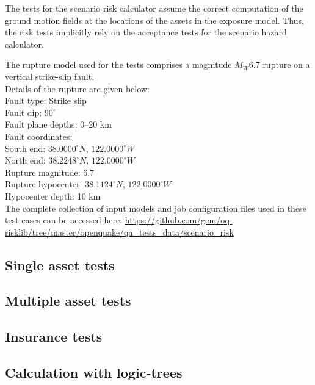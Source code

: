 The tests for the scenario risk calculator assume the correct computation of the ground motion fields at the locations of the assets in the exposure model. Thus, the risk tests implicitly rely on the acceptance tests for the scenario hazard calculator.

The rupture model used for the tests comprises a magnitude $M_W 6.7$ rupture on a vertical strike-slip fault.\\

\noindent Details of the rupture are given below:\\

\noindent
Fault type: Strike slip\\
Fault dip: $90^{\circ}$\\
Fault plane depths: 0--20 km\\
Fault coordinates:\\
South end: $38.0000^{\circ} N$, $122.0000^{\circ} W$\\
North end: $38.2248^{\circ} N$, $122.0000^{\circ} W$\\
Rupture magnitude: 6.7\\
Rupture hypocenter: $38.1124^{\circ} N$, $122.0000^{\circ} W$\\
Hypocenter depth: 10 km\\

The complete collection of input models and job configuration files used in these test cases can be accessed here:
\href{https://github.com/gem/oq-risklib/tree/master/openquake/qa_tests_data/scenario_risk}
{https://github.com/gem/oq-risklib/tree/master/openquake/qa\_tests\_data/scenario\_risk}

\subsection{Single asset tests}
\label{subsec:acc-sr-single}


\subsection{Multiple asset tests}
\label{subsec:acc-sr-multiple}


\subsection{Insurance tests}
\label{subsec:acc-sr-insurance}


\subsection{Calculation with logic-trees}
\label{subsec:acc-sr-lt}


